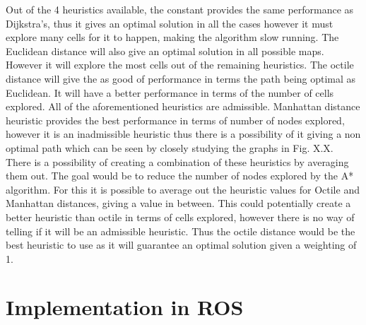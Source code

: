 \documentclass[a4paper,12pt]{article}
\begin{document}
				Out of the 4 heuristics available, the constant provides the same performance as Dijkstra’s, thus it gives an optimal solution in all the cases however it must explore many cells for it to happen, making the algorithm slow running. The Euclidean distance will also give an optimal solution in all possible maps. However it will explore the most cells out of the remaining heuristics. The octile distance will give the as good of performance in terms the path being optimal as Euclidean. It will have a better performance in terms of the number of cells explored. All of the aforementioned heuristics are admissible. Manhattan distance heuristic provides the best performance in terms of number of nodes explored, however it is an inadmissible heuristic thus there is a possibility of it giving a non optimal path which can be seen by closely studying the graphs in Fig. X.X.
				\\
				There is a possibility of creating a combination of these heuristics by averaging them out. The goal would be to reduce the number of nodes explored by the A* algorithm. For this it is possible to average out the heuristic values for Octile and Manhattan distances, giving a value in between. This could potentially create a better heuristic than octile in terms of cells explored, however there is no way of telling if it will be an admissible heuristic. Thus the octile distance would be the best heuristic to use as it will guarantee an optimal solution given a weighting of 1. 

	\section{Implementation in ROS}
	
\end{document}
